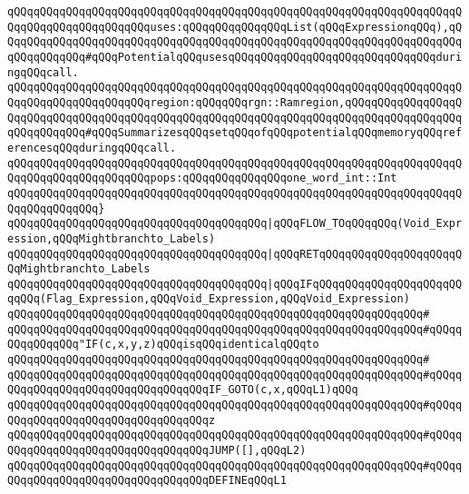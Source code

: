 \verb|qQQqqQQqqQQqqQQqqQQqqQQqqQQqqQQqqQQqqQQqqQQqqQQqqQQqqQQqqQQqqQQqqQQqqQQqqQQqqQQqqQQqqQQqqQQquses:qQQqqQQqqQQqqQQqList(qQQqExpressionqQQq),qQQqqQQqqQQqqQQqqQQqqQQqqQQqqQQqqQQqqQQqqQQqqQQqqQQqqQQqqQQqqQQqqQQqqQQqqQQqqQQqqQQq#qQQqPotentialqQQqusesqQQqqQQqqQQqqQQqqQQqqQQqqQQqqQQqduringqQQqcall.|\newline
\verb|qQQqqQQqqQQqqQQqqQQqqQQqqQQqqQQqqQQqqQQqqQQqqQQqqQQqqQQqqQQqqQQqqQQqqQQqqQQqqQQqqQQqqQQqqQQqregion:qQQqqQQqrgn::Ramregion,qQQqqQQqqQQqqQQqqQQqqQQqqQQqqQQqqQQqqQQqqQQqqQQqqQQqqQQqqQQqqQQqqQQqqQQqqQQqqQQqqQQqqQQqqQQqqQQqqQQq#qQQqSummarizesqQQqsetqQQqofqQQqpotentialqQQqmemoryqQQqreferencesqQQqduringqQQqcall.|\newline
\verb|qQQqqQQqqQQqqQQqqQQqqQQqqQQqqQQqqQQqqQQqqQQqqQQqqQQqqQQqqQQqqQQqqQQqqQQqqQQqqQQqqQQqqQQqqQQqpops:qQQqqQQqqQQqqQQqone_word_int::Int|\newline
\verb|qQQqqQQqqQQqqQQqqQQqqQQqqQQqqQQqqQQqqQQqqQQqqQQqqQQqqQQqqQQqqQQqqQQqqQQqqQQqqQQqqQQq}|\newline
\newline
\verb|qQQqqQQqqQQqqQQqqQQqqQQqqQQqqQQqqQQqqQQq|\verb#|qQQqFLOW_TOqQQqqQQq(Void_Expression,qQQqMightbranchto_Labels)#\newline
\verb|qQQqqQQqqQQqqQQqqQQqqQQqqQQqqQQqqQQqqQQq|\verb#|qQQqRETqQQqqQQqqQQqqQQqqQQqqQQqMightbranchto_Labels#\newline
\verb|qQQqqQQqqQQqqQQqqQQqqQQqqQQqqQQqqQQqqQQq|\verb#|qQQqIFqQQqqQQqqQQqqQQqqQQqqQQqqQQq(Flag_Expression,qQQqVoid_Expression,qQQqVoid_Expression)#\newline
\verb|qQQqqQQqqQQqqQQqqQQqqQQqqQQqqQQqqQQqqQQqqQQqqQQqqQQqqQQqqQQqqQQq#|\newline
\verb|qQQqqQQqqQQqqQQqqQQqqQQqqQQqqQQqqQQqqQQqqQQqqQQqqQQqqQQqqQQqqQQq#qQQqqQQqqQQqqQQq"IF(c,x,y,z)qQQqisqQQqidenticalqQQqto|\newline
\verb|qQQqqQQqqQQqqQQqqQQqqQQqqQQqqQQqqQQqqQQqqQQqqQQqqQQqqQQqqQQqqQQq#|\newline
\verb|qQQqqQQqqQQqqQQqqQQqqQQqqQQqqQQqqQQqqQQqqQQqqQQqqQQqqQQqqQQqqQQq#qQQqqQQqqQQqqQQqqQQqqQQqqQQqqQQqqQQqIF_GOTO(c,x,qQQqL1)qQQq|\newline
\verb|qQQqqQQqqQQqqQQqqQQqqQQqqQQqqQQqqQQqqQQqqQQqqQQqqQQqqQQqqQQqqQQq#qQQqqQQqqQQqqQQqqQQqqQQqqQQqqQQqqQQqz|\newline
\verb|qQQqqQQqqQQqqQQqqQQqqQQqqQQqqQQqqQQqqQQqqQQqqQQqqQQqqQQqqQQqqQQq#qQQqqQQqqQQqqQQqqQQqqQQqqQQqqQQqqQQqJUMP([],qQQqL2)|\newline
\verb|qQQqqQQqqQQqqQQqqQQqqQQqqQQqqQQqqQQqqQQqqQQqqQQqqQQqqQQqqQQqqQQq#qQQqqQQqqQQqqQQqqQQqqQQqqQQqqQQqqQQqDEFINEqQQqL1|\newline
